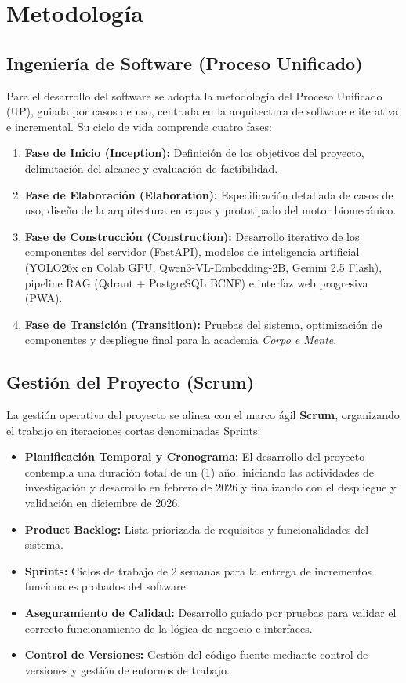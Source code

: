 \newpage

\section{Metodología}

\subsection{Ingeniería de Software (Proceso Unificado)}
Para el desarrollo del software se adopta la metodología del Proceso Unificado (UP), guiada por casos de uso, centrada en la arquitectura de software e iterativa e incremental. Su ciclo de vida comprende cuatro fases:

\begin{enumerate}
    \item \textbf{Fase de Inicio (Inception):} Definición de los objetivos del proyecto, delimitación del alcance y evaluación de factibilidad.
    \item \textbf{Fase de Elaboración (Elaboration):} Especificación detallada de casos de uso, diseño de la arquitectura en capas y prototipado del motor biomecánico.
    \item \textbf{Fase de Construcción (Construction):} Desarrollo iterativo de los componentes del servidor (FastAPI), modelos de inteligencia artificial (YOLO26x en Colab GPU, Qwen3-VL-Embedding-2B, Gemini 2.5 Flash), pipeline RAG (Qdrant + PostgreSQL BCNF) e interfaz web progresiva (PWA).
    \item \textbf{Fase de Transición (Transition):} Pruebas del sistema, optimización de componentes y despliegue final para la academia \textit{Corpo e Mente}.
\end{enumerate}

\subsection{Gestión del Proyecto (Scrum)}
La gestión operativa del proyecto se alinea con el marco ágil \textbf{Scrum}, organizando el trabajo en iteraciones cortas denominadas Sprints:

\begin{itemize}
    \item \textbf{Planificación Temporal y Cronograma:} El desarrollo del proyecto contempla una duración total de un (1) año, iniciando las actividades de investigación y desarrollo en febrero de 2026 y finalizando con el despliegue y validación en diciembre de 2026.
    \item \textbf{Product Backlog:} Lista priorizada de requisitos y funcionalidades del sistema.
    \item \textbf{Sprints:} Ciclos de trabajo de 2 semanas para la entrega de incrementos funcionales probados del software.
    \item \textbf{Aseguramiento de Calidad:} Desarrollo guiado por pruebas para validar el correcto funcionamiento de la lógica de negocio e interfaces.
    \item \textbf{Control de Versiones:} Gestión del código fuente mediante control de versiones y gestión de entornos de trabajo.
\end{itemize}
